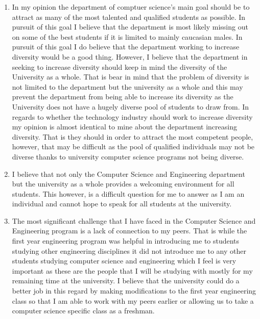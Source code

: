\documentclass[letterpaper]{article}
\begin{document}
\begin{enumerate}

\item{}In my opinion the department of comptuer science's main goal 
should be to attract as many of the most talented and qualified students 
as possible. In pursuit of this goal I believe that the department is 
most likely missing out on some of the best students if it is limited to 
mainly caucasian males. In pursuit of this goal I do believe that the 
department working to increase diversity would be a good thing. However, 
I believe that the department in seeking to increase diversity should 
keep in mind the diversity of the University as a whole. That is bear in 
mind that the problem of diversity is not limited to the department but 
the university as a whole and this may prevent the department from being 
able to increase its diversity as the University does not have a hugely 
diverse pool of students to draw from. In regards to whether the 
technology industry should work to increase diversity my opinion is 
almost identical to mine about the department increasing diversity. That 
is they should in order to attract the most competent people, however, 
that may be difficult as the pool of qualified individuals may not be 
diverse thanks to university computer science programs not being 
diverse.

\item{}I believe that not only the Computer Science and Engineering 
department but the university as a whole provides a welcoming 
environment for all students. This however, is a difficult question for 
me to answer as I am an individual and cannot hope to speak for all 
students at the university.

\item{}The most significant challenge that I have faced in the Computer 
Science and Engineering program is a lack of connection to my peers. 
That is while the first year engineering program was helpful in 
introducing me to students studying other engineering disciplines it did 
not introduce me to any other students studying computer science and 
engineering which I feel is very important as these are the people that 
I will be studying with mostly for my remaining time at the university.
I believe that the university could do a better job in this regard by 
making modifications to the first year engineering class so that I am 
able to work with my peers earlier or allowing us to take a computer 
science specific class as a freshman.

\end{enumerate}
\end{document}
